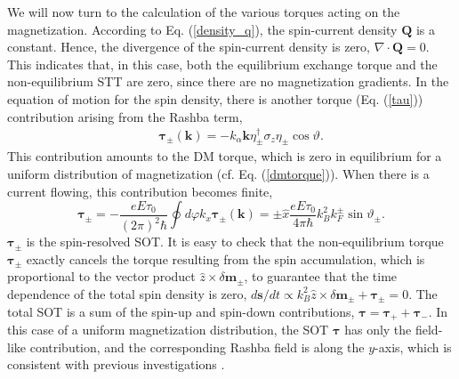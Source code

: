 \documentclass[12pt]{iopart}
\begin{document}
We will now turn to the calculation of the various torques acting on the magnetization. According to Eq. (\ref{density_q}), the spin-current density $\textbf{Q}$ is a constant. Hence, the divergence of the spin-current density is zero, $\nabla \cdot \textbf{Q} = 0$. This indicates that, in this case, both the equilibrium exchange torque and the non-equilibrium STT are zero, since there are no magnetization gradients. In the equation of motion for the spin density, there is another torque (Eq. (\ref{tau})) contribution arising from the Rashba term,
\begin{eqnarray}
&&\bm {\tau} _\pm (\textbf{k}) = - k_\alpha \textbf{k} \eta ^\dagger _\pm \sigma_z \eta _\pm \cos \vartheta.
\end{eqnarray}
This contribution amounts to the DM torque, which is zero in equilibrium for a uniform distribution of magnetization (cf. Eq. (\ref{dmtorque})). When there is a current flowing, this contribution becomes finite,
\begin{equation}
\bm {\tau} _\pm = - \frac{e E \tau_0} {(2\pi)^2\hbar} \oint d \varphi k_x \bm {\tau} _\pm (\textbf{k}) = \pm \hat {x} \frac{e E \tau_0} {4\pi\hbar} k_B^2 k_ F ^ \pm \sin \vartheta_\pm.
\end{equation}
$\bm {\tau} _\pm$ is the spin-resolved SOT. It is easy to check that the non-equilibrium torque $\bm {\tau} _\pm$ exactly cancels the torque resulting from the spin accumulation, which is proportional to the vector product $\hat {z} \times \delta \textbf {m} _\pm$, to guarantee that the time dependence of the total spin density is zero, $d \textbf {s}/ dt \propto k_B^2 \hat{z} \times \delta \textbf{m} _\pm + \bm {\tau} _\pm = 0$. The total SOT is a sum of the spin-up and spin-down contributions, $\bm {\tau} = \bm {\tau} _+ + \bm {\tau} _-$. In this case of a uniform magnetization distribution, the SOT $\bm {\tau}$ has only the field-like contribution, and the corresponding Rashba field is along the $y$-axis, which is consistent with previous investigations \cite{Garate,Manchon,Obata,Matos-Abiague}.
\end{document}

